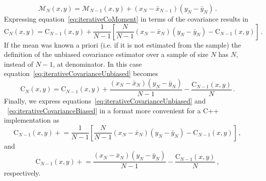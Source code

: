 \documentclass[10pt,a4paper]{report}
\begin{document}
\begin{equation}
\mathcal{M}_N(x,y) = \mathcal{M}_{N-1}(x,y) + (x_N - \bar{x}_{N-1})(y_N - \bar{y}_N) \, .
\label{eq:iterativeCoMoment}
\end{equation}
Expressing equation~\ref{eq:iterativeCoMoment} in terms of the covariance results in
\begin{equation}
\mbox{C}_N(x,y) = \mbox{C}_{N-1}(x,y) + \frac{1}{N-1}\left[\frac{N}{N-1}(x_N - \bar{x}_N)(y_N - \bar{y}_N) - \mbox{C}_{N-1}(x,y)\right] \, .
\label{eq:iterativeCovarianceUnbiased}
\end{equation}
If the mean was known a priori (i.e. if it is not estimated from the sample) the definition of the unbiased covariance estimator over a sample of size $N$ has $N$, instead of $N-1$, at denominator. In this case equation~\ref{eq:iterativeCovarianceUnbiased} becomes
\begin{equation}
\mbox{C}_N(x,y) = \mbox{C}_{N-1}(x,y) + \frac{(x_N - \bar{x}_N)(y_N - \bar{y}_N)}{N-1} - \frac{\mbox{C}_{N-1}(x,y)}{N} \, .
\label{eq:iterativeCovarianceBiased}
\end{equation}
Finally, we express equations~\ref{eq:iterativeCovarianceUnbiased} and ~\ref{eq:iterativeCovarianceBiased} in a format more convenient for a C++ implementation as
\begin{equation}
\mbox{C}_{N-1}(x,y) \mathrel{+}= \frac{1}{N-1}\left[\frac{N}{N-1}(x_N - \bar{x}_N)(y_N - \bar{y}_N) - \mbox{C}_{N-1}(x,y)\right] \, ,
\end{equation}
and
\begin{equation}
\mbox{C}_{N-1}(x,y) \mathrel{+}= \frac{(x_N - \bar{x}_N)(y_N - \bar{y}_N)}{N-1} - \frac{\mbox{C}_{N-1}(x,y)}{N} \, ,
\end{equation}
respectively.

{}

\end{document}
